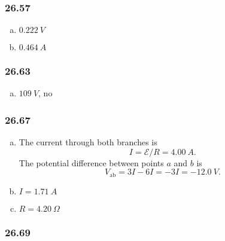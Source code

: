 \documentclass{article}
\begin{document}
\subsubsection{26.57}

\begin{enumerate}[(a)]
  \item $\qty{0.222}{V}$

  \item $\qty{0.464}{A}$
\end{enumerate}

\subsubsection{26.63}

\begin{enumerate}[(a)]
  \item $\qty{109}{V}$, no
\end{enumerate}

\subsubsection{26.67}

\begin{enumerate}[(a)]
  \item The current through both branches is \[I = \mathcal{E} / R = \qty{4.00}{A}.\] The potential difference between points $a$ and $b$ is \[V_\textrm{ab} = 3 I - 6 I = -3 I = \qty{-12.0}{V}.\]

  \item $I = \qty{1.71}{A}$

  \item $R = \qty{4.20}{\Omega}$
\end{enumerate}

\subsubsection{26.69}
\end{document}
